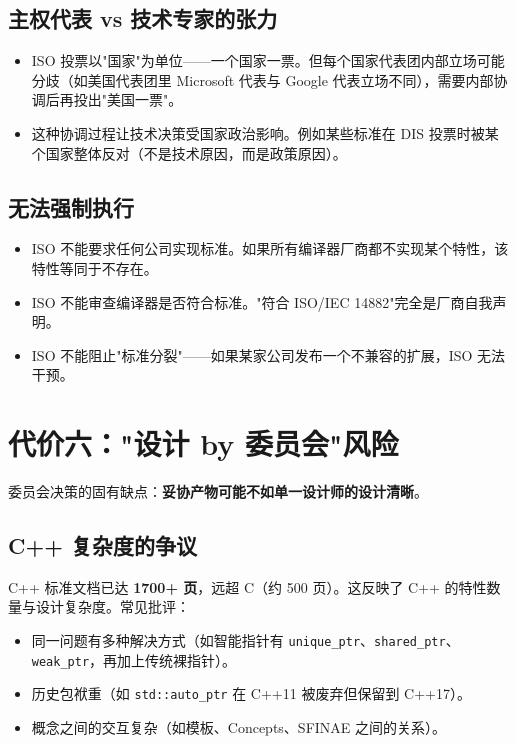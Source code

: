 \documentclass[12pt,a4paper,fontset=fandol]{ctexbook}
\newcommand{\kw}[1]{\texttt{#1}}
\begin{document}
\subsection{主权代表 vs 技术专家的张力}

\begin{itemize}
  \item ISO 投票以"国家"为单位——一个国家一票。但每个国家代表团内部立场可能分歧（如美国代表团里 Microsoft 代表与 Google 代表立场不同），需要内部协调后再投出"美国一票"。
  \item 这种协调过程让技术决策受国家政治影响。例如某些标准在 DIS 投票时被某个国家整体反对（不是技术原因，而是政策原因）。
\end{itemize}

\subsection{无法强制执行}

\begin{itemize}
  \item ISO 不能要求任何公司实现标准。如果所有编译器厂商都不实现某个特性，该特性等同于不存在。
  \item ISO 不能审查编译器是否符合标准。"符合 ISO/IEC 14882"完全是厂商自我声明。
  \item ISO 不能阻止"标准分裂"——如果某家公司发布一个不兼容的扩展，ISO 无法干预。
\end{itemize}

\section{代价六："设计 by 委员会"风险}

委员会决策的固有缺点：\textbf{妥协产物可能不如单一设计师的设计清晰}。

\subsection{C++ 复杂度的争议}

C++ 标准文档已达 \textbf{1700+ 页}，远超 C（约 500 页）。这反映了 C++ 的特性数量与设计复杂度。常见批评：

\begin{itemize}
  \item 同一问题有多种解决方式（如智能指针有 \kw{unique\_ptr}、\kw{shared\_ptr}、\kw{weak\_ptr}，再加上传统裸指针）。
  \item 历史包袱重（如 \kw{std::auto\_ptr} 在 C++11 被废弃但保留到 C++17）。
  \item 概念之间的交互复杂（如模板、Concepts、SFINAE 之间的关系）。
\end{itemize}
\end{document}
